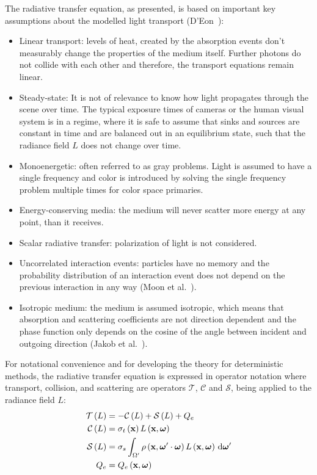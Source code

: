 The radiative transfer equation, as presented, is based on important key assumptions about the modelled light transport (D'Eon~\cite{DEon14}):
\begin{itemize}
\item Linear transport: levels of heat, created by the absorption events don't measurably change the properties of the medium itself. Further photons do not collide with each other and therefore, the transport equations remain linear.
\item Steady-state: It is not of relevance to know how light propagates through the scene over time. The typical exposure times of cameras or the human visual system is in a regime, where it is safe to assume that sinks and sources are constant in time and are balanced out in an equilibrium state, such that the radiance field $L$ does not change over time.
\item Monoenergetic: often referred to as gray problems. Light is assumed to have a single frequency and color is introduced by solving the single frequency problem multiple times for color space primaries.
\item Energy-conserving media: the medium will never scatter more energy at any point, than it receives.
\item Scalar radiative transfer: polarization of light is not considered.
\item Uncorrelated interaction events: particles have no memory and the probability distribution of an interaction event does not depend on the previous interaction in any way (Moon et al.~\cite{Moon07}).
\item Isotropic medium: the medium is assumed isotropic, which means that absorption and scattering coefficients are not direction dependent and the phase function only depends on the cosine of the angle between incident and outgoing direction (Jakob et al.~\cite{Jakob10}).
\end{itemize}

For notational convenience and for developing the theory for deterministic methods, the radiative transfer equation is expressed in operator notation where transport, collision, and scattering are operators $\mathcal{T}$, $\mathcal{C}$ and $\mathcal{S}$, being applied to the radiance field $L$:
\begin{align}
\mathcal{T}\left(L\right) &= -\mathcal{C}\left(L\right) + \mathcal{S}\left(L\right) + Q_e
\label{eq:rte_operator_notation}
\\
\mathcal{C}\left(L\right) &= \sigma_t\left(\boldsymbol{\mathbf{x}}\right) L\left(\boldsymbol{\mathbf{x}}, \boldsymbol{\mathbf{\omega}} \right)
\nonumber
\\
\mathcal{S}\left(L\right) &= \sigma_s \int_{\Omega'}\rho\left(\boldsymbol{\mathbf{x}}, \boldsymbol{\mathbf{\omega}}'\cdot\boldsymbol{\mathbf{\omega}}\right)L\left(\boldsymbol{\mathbf{x}}, \boldsymbol{\mathbf{\omega}} \right)\,\mathrm{d}\boldsymbol{\mathbf{\omega}}'
\nonumber
\\
Q_e &= Q_e\left(\boldsymbol{\mathbf{x}}, \boldsymbol{\mathbf{\omega}}\right)
\nonumber
\end{align}

